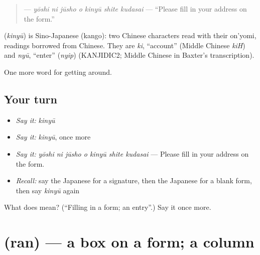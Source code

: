 \begin{quote}
\textbf{   } — \emph{yōshi ni jūsho o kinyū shite kudasai} — \textquotedblleft{}Please fill in your address on the form.\textquotedblright{}
\end{quote}

\begin{cousinweb}
\textbf{} (\emph{kinyū}) is Sino-Japanese (kango): two Chinese characters read with their on'yomi, readings borrowed from Chinese. They are \emph{ki}, \textquotedblleft{}account\textquotedblright{} (Middle Chinese \emph{kiH}) and \emph{nyū}, \textquotedblleft{}enter\textquotedblright{} (\emph{nyip}) (KANJIDIC2; Middle Chinese in Baxter's transcription).
\end{cousinweb}

\begin{grammarlens}[title={What you've built}]
One more word for getting around.
\end{grammarlens}

\subsection*{Your turn}
\begin{itemize}
\raggedright
  \item \emph{Say it:} \emph{kinyū}
  \item \emph{Say it:} \emph{kinyū}, once more
  \item \emph{Say it:} \emph{yōshi ni jūsho o kinyū shite kudasai} — Please fill in your address on the form.
  \item \emph{Recall:} say the Japanese for a signature, then the Japanese for a blank form, then say \emph{kinyū} again
\end{itemize}

\begin{tcolorbox}[breakable,colback=teal!4,colframe=teal!35!black,title={Before you move on}]
What does  mean? (\textquotedblleft{}Filling in a form; an entry\textquotedblright{}.) Say it once more.
\end{tcolorbox}
\section[\texorpdfstring{\ja{らん} (ran)}{らん (ran)}]{ (ran) — a box on a form; a column}

\label{lesson:JA-C418-ran}



